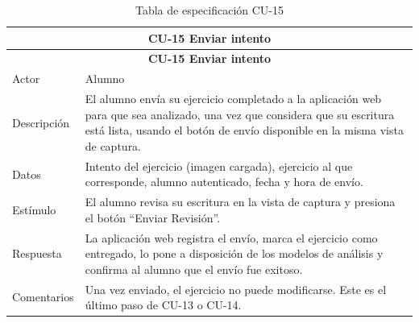 \begin{longtable}{|p{4cm}|p{11cm}|}
\caption{Tabla de especificación CU-15}
\label{tab:cu15} \\

\hline
\multicolumn{2}{|c|}{\textbf{CU-15 Enviar intento}} \\
\hline
\endfirsthead

\hline
\multicolumn{2}{|c|}{\textbf{CU-15 Enviar intento}} \\
\hline
\endhead

\hline
\endfoot
\endlastfoot

Actor & Alumno \\
\hline

Descripción & El alumno envía su ejercicio completado a la aplicación web para que sea analizado, una vez que considera que su escritura está lista, usando el botón de envío disponible en la misma vista de captura. \\
\hline

Datos & Intento del ejercicio (imagen cargada), ejercicio al que corresponde, alumno autenticado, fecha y hora de envío. \\
\hline

Estímulo & El alumno revisa su escritura en la vista de captura y presiona el botón “Enviar Revisión”. \\
\hline

Respuesta & La aplicación web registra el envío, marca el ejercicio como entregado, lo pone a disposición de los modelos de análisis y confirma al alumno que el envío fue exitoso. \\
\hline

Comentarios & Una vez enviado, el ejercicio no puede modificarse. Este es el último paso de CU-13 o CU-14. \\
\hline

\end{longtable}


